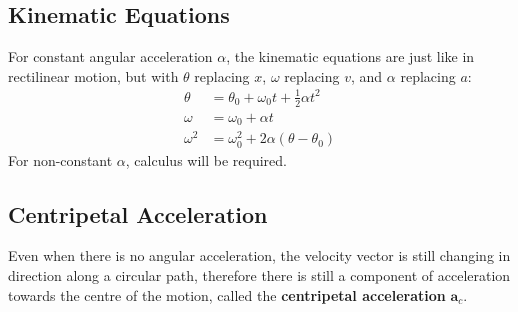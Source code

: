 \subsection{Kinematic Equations}
For constant angular acceleration $\alpha$, the kinematic equations are just
like in rectilinear motion, but with $\theta$ replacing $x$, $\omega$ replacing
$v$, and $\alpha$ replacing $a$:
\begin{align}
  \theta &=\theta_0 + \omega_0 t + \frac12\alpha t^2\\
  \omega &=\omega_0+ \alpha t\\
  \omega^2& = \omega_0^2+ 2\alpha(\theta-\theta_0)
\end{align}
For non-constant $\alpha$, calculus will be required.








\subsection{Centripetal Acceleration}
Even when there is no angular acceleration, the velocity vector is still
changing in direction along a circular path, therefore there is still a
component of acceleration towards the centre of the motion, called the
\textbf{centripetal acceleration} $\bm a_c$.

